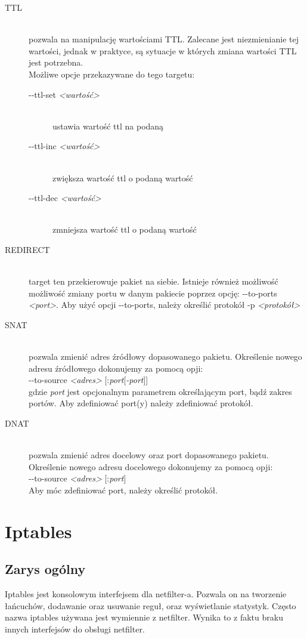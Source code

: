 \documentclass[a4paper,12pt,oneside]{book}
\newcommand{\param}[1]{\textit{\textless #1\textgreater}}
\begin{document}
\begin{description}
				\item[TTL] \hfill \\
					pozwala na manipulację wartościami TTL. Zalecane jest niezmienianie tej wartości, jednak w praktyce, są sytuacje w których zmiana wartości TTL jest potrzebna.\\
					Możliwe opcje przekazywane do tego targetu:
					\begin{description}
						\item[-{}-ttl-set \param{wartość}] \hfill \\
							ustawia wartość ttl na podaną
						\item[-{}-ttl-inc \param{wartość}] \hfill \\
							zwiększa wartość ttl o podaną wartość
						\item[-{}-ttl-dec \param{wartość}] \hfill \\
							zmniejsza wartość ttl o podaną wartość
					\end{description}
				\item[REDIRECT] \hfill \\
					target ten przekierowuje pakiet na siebie. Istnieje również możliwość możliwość zmiany portu w danym pakiecie poprzez opcję: -{}-to-ports \param{port}.
					Aby użyć opcji -{}-to-ports, należy określić protokół -p \param{protokół}
				\item[SNAT] \hfill \\
					pozwala zmienić adres źródłowy dopasowanego pakietu. Określenie nowego adresu źródłowego dokonujemy za pomocą opji:\\
					-{}-to-source \param{adres} [:\textit{port}[\textit{-port}]]\\
					gdzie \textit{port} jest opcjonalnym parametrem określającym port, bądź zakres portów. Aby zdefiniować port(y) należy zdefiniować protokół.
				\item[DNAT] \hfill \\
					pozwala zmienić adres docelowy oraz port dopasowanego pakietu. Określenie nowego adresu docelowego dokonujemy za pomocą opji:\\
					-{}-to-source \param{adres} [:\textit{port}]\\
					Aby móc zdefiniować port, należy określić protokół.
			\end{description}
\chapter{Iptables}
	\section{Zarys ogólny}
		Iptables jest konsolowym interfejsem dla netfilter-a. Pozwala on na tworzenie łańcuchów, dodawanie oraz usuwanie reguł, oraz wyświetlanie statystyk.
		Często nazwa iptables używana jest wymiennie z netfilter. Wynika to z faktu braku innych interfejsów do obsługi netfilter.
\end{document}
